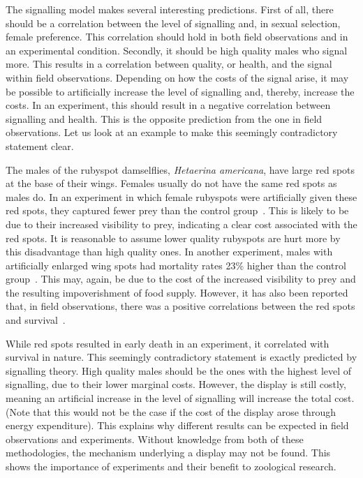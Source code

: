 \documentclass[a4paper,12pt]{article}
\numberwithin{equation}{section}
\begin{document}
The signalling model makes several interesting predictions. First of all, there should be a correlation between the level of signalling and, in sexual selection, female preference. This correlation should hold in both field observations and in an experimental condition. Secondly, it should be high quality males who signal more. This results in a correlation between quality, or health, and the signal within field observations. Depending on how the costs of the signal arise, it may be possible to artificially increase the level of signalling and, thereby, increase the costs. In an experiment, this should result in a negative correlation between signalling and health. This is the opposite prediction from the one in field observations. Let us look at an example to make this seemingly contradictory statement clear.

The males of the rubyspot damselflies, \textit{Hetaerina americana}, have large red spots at the base of their wings. Females usually do not have the same red spots as males do. In an experiment in which female rubyspots were artificially given these red spots, they captured fewer prey than the control group~\cite{Grether1996b}. This is likely to be due to their increased visibility to prey, indicating a clear cost associated with the red spots. It is reasonable to assume lower quality rubyspots are hurt more by this disadvantage than high quality ones. In another experiment, males with artificially enlarged wing spots had mortality rates 23\% higher than the control group~\cite{Grether1997}. This may, again, be due to the cost of the increased visibility to prey and the resulting impoverishment of food supply. However, it has also been reported that, in field observations, there was a positive correlations between the red spots and survival~\cite{Grether1996a}.

While red spots resulted in early death in an experiment, it correlated with survival in nature. This seemingly contradictory statement is exactly predicted by signalling theory. High quality males should be the ones with the highest level of signalling, due to their lower marginal costs. However, the display is still costly, meaning an artificial increase in the level of signalling will increase the total cost. (Note that this would not be the case if the cost of the display arose through energy expenditure). This explains why different results can be expected in field observations and experiments. Without knowledge from both of these methodologies, the mechanism underlying a display may not be found. This shows the importance of experiments and their benefit to zoological research.
\end{document}
